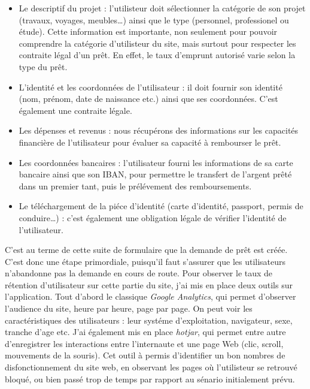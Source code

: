 \begin{itemize}
\tightlist
\item
  Le descriptif du projet : l'utilisteur doit sélectionner la catégorie
  de son projet (travaux, voyages, meubles\ldots{}) ainsi que le type
  (personnel, professionel ou étude). Cette information est importante,
  non seulement pour pouvoir comprendre la catégorie d'utilisteur du
  site, mais surtout pour respecter les contraite légal d'un prêt. En
  effet, le taux d'emprunt autorisé varie selon la type du prêt.
\item
  L'identité et les coordonnées de l'utilisateur : il doit fournir son
  identité (nom, prénom, date de naissance etc.) ainsi que ses
  coordonnées. C'est également une contraite légale.
\item
  Les dépenses et revenus : nous récupérons des informations sur les
  capacités financière de l'utilisateur pour évaluer sa capacité à
  rembourser le prêt.
\item
  Les coordonnées bancaires : l'utilisateur fourni les informations de
  sa carte bancaire ainsi que son IBAN, pour permettre le transfert de
  l'argent prêté dans un premier tant, puis le prélévement des
  remboursements.
\item
  Le téléchargement de la piéce d'identité (carte d'identité, passport,
  permis de conduire\ldots{}) : c'est également une obligation légale de
  vérifier l'identité de l'utilisateur.
\end{itemize}

\bigskip

C'est au terme de cette suite de formulaire que la demande de prêt est
créée. C'est donc une étape primordiale, puisqu'il faut s'assurer que
les utilisateurs n'abandonne pas la demande en cours de route. Pour
observer le taux de rétention d'utilisateur sur cette partie du site,
j'ai mis en place deux outils sur l'application. Tout d'abord le
classique \emph{Google Analytics}, qui permet d'observer l'audience du
site, heure par heure, page par page. On peut voir les caractéristiques
des utilisateurs : leur systéme d'exploitation, navigateur, sexe,
tranche d'age etc. J'ai également mis en place \emph{hotjar}, qui permet
entre autre d'enregistrer les interactions entre l'internaute et une
page Web (clic, scroll, mouvements de la souris). Cet outil à permis
d'identifier un bon nombres de disfonctionnement du site web, en
observant les pages où l'utilisteur se retrouvé bloqué, ou bien passé
trop de temps par rapport au sénario initialement prévu.

